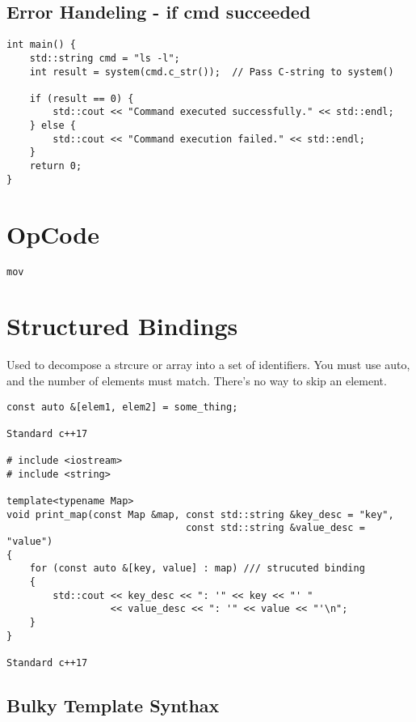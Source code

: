 \documentclass[openany]{report}
\begin{document}
\subsection{Error Handeling - if cmd succeeded}

\begin{verbatim}
int main() {
    std::string cmd = "ls -l";
    int result = system(cmd.c_str());  // Pass C-string to system()

    if (result == 0) {
        std::cout << "Command executed successfully." << std::endl;
    } else {
        std::cout << "Command execution failed." << std::endl;
    }
    return 0;
}
\end{verbatim}

\section{OpCode}
\begin{verbatim}
mov
\end{verbatim}

\section{Structured Bindings}

Used to decompose a strcure or array into a set of identifiers.
You must use auto, and the number of elements must match. There's no way to skip an element.

\begin{verbatim}
const auto &[elem1, elem2] = some_thing;

Standard c++17

# include <iostream>
# include <string>

template<typename Map>
void print_map(const Map &map, const std::string &key_desc = "key",
                               const std::string &value_desc = "value")
{
    for (const auto &[key, value] : map) /// strucuted binding
    {
        std::cout << key_desc << ": '" << key << "' "
                  << value_desc << ": '" << value << "'\n";
    }
}

Standard c++17
\end{verbatim}

\subsection{Bulky Template Synthax}
\end{document}
